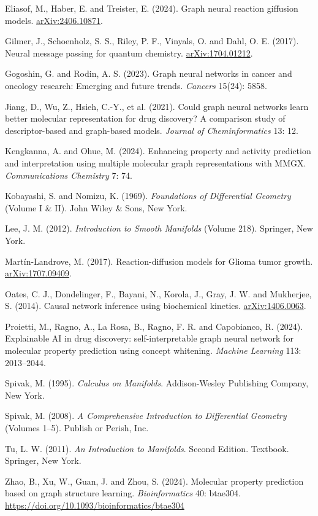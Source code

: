 \begin{bookreferences}
  \item Eliasof, M., Haber, E. and Treister, E. (2024). Graph neural reaction giffusion models. \href{https://arxiv.org/abs/2406.10871}{arXiv:2406.10871}.
  \item Gilmer, J., Schoenholz, S. S., Riley, P. F., Vinyals, O. and Dahl, O. E. (2017). Neural message passing for quantum chemistry. \href{https://arxiv.org/abs/1704.01212}{arXiv:1704.01212}.
  \item Gogoshin, G. and Rodin, A. S. (2023). Graph neural networks in cancer and oncology research: Emerging and future trends. \emph{Cancers} 15(24): 5858.
  \item Jiang, D., Wu, Z., Hsieh, C.-Y., et al. (2021). Could graph neural networks learn better molecular representation for drug discovery? A comparison study of descriptor-based and graph-based models. \emph{Journal of Cheminformatics} 13: 12.
  \item Kengkanna, A. and Ohue, M. (2024). Enhancing property and activity prediction and interpretation using multiple molecular graph representations with MMGX. \emph{Communications Chemistry} 7: 74.
  \item Kobayashi, S. and Nomizu, K. (1969). \emph{Foundations of Differential Geometry} (Volume I \& II). John Wiley \& Sons, New York.
  \item Lee, J. M. (2012). \emph{Introduction to Smooth Manifolds} (Volume 218). Springer, New York.
  \item Martín-Landrove, M. (2017). Reaction-diffusion models for Glioma tumor growth. \href{https://arxiv.org/abs/1707.09409}{arXiv:1707.09409}.
  \item Oates, C. J., Dondelinger, F., Bayani, N., Korola, J., Gray, J. W. and Mukherjee, S. (2014). Causal network inference using biochemical kinetics. \href{https://arxiv.org/abs/1406.0063}{arXiv:1406.0063}.
  \item Proietti, M., Ragno, A., La Rosa, B., Ragno, F. R. and Capobianco, R. (2024). Explainable AI in drug discovery: self-interpretable graph neural network for molecular property prediction using concept whitening. \emph{Machine Learning} 113: 2013–2044.
  \item Spivak, M. (1995). \emph{Calculus on Manifolds}. Addison-Wesley Publishing Company, New York.
  \item Spivak, M. (2008). \emph{A Comprehensive Introduction to Differential Geometry} (Volumes 1–5). Publish or Perish, Inc.
  \item Tu, L. W. (2011). \emph{An Introduction to Manifolds}. Second Edition. Textbook. Springer, New York.
  \item Zhao, B., Xu, W., Guan, J. and Zhou, S. (2024). Molecular property prediction based on graph structure learning. \emph{Bioinformatics} 40: btae304. \url{https://doi.org/10.1093/bioinformatics/btae304}
\end{bookreferences}
